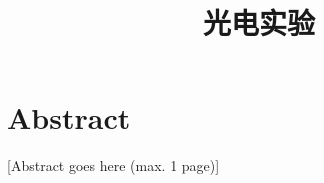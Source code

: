 \documentclass[a4paper, 12pt, UTF8]{article}
\title{光电实验}
\begin{document}


\clearpage
\thispagestyle{empty}
\section*{Abstract}

[Abstract goes here (max. 1 page)]




\clearpage
{}
\tableofcontents
\clearpage
\listoffigures
\clearpage
\listoftables
\clearpage













\appendix
\renewcommand*{\thesection}{\Alph{section}}\textbf{}








\clearpage
\renewcommand*{\thesection}{}\textbf{}


\end{document}

